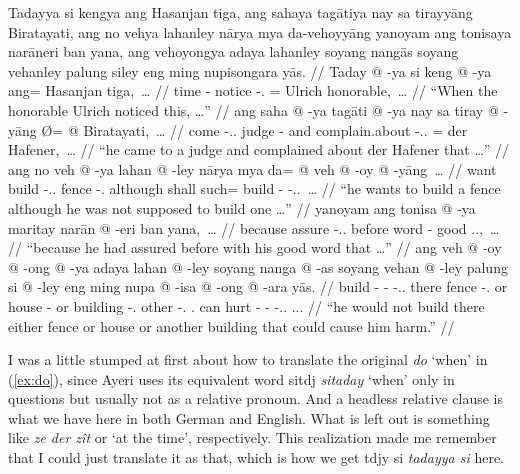 \documentclass[12pt,paper=a4]{scrartcl}
\newcommand{\fw}[1]{\textit{#1}} %
\newcommand{\ayr}[1]{{\Tagati #1}}
\newcommand{\xayr}[3]{{\Tagati #1} \emph{#2} \enquote*{#3}}
\begin{document}
\pex
	\glpreamble Tadayya si kengya ang Hasanjan tiga, ang sahaya tagātiya nay 
		sa tirayyāng Birata\-yati, ang no vehya lahanley nārya mya 
		da-vehoyyāng yanoyam ang tonisaya narāneri ban yana, ang 
		vehoyongya adaya lahanley soyang nangās soyang vehanley palung 
		siley eng ming nupisongara yās. //
	\a \label{ex:do} \begingl
		\gla Taday @ -ya si keng @ -ya ang= Hasanjan tiga,~… //
		\glb time -\Loc{} \Rel{} notice -\Tsg{}.\M{} \Aarg{}= Ulrich 
			honorable,~… //
		\glft \enquote{When the honorable Ulrich noticed this, …} //
	\endgl
	\a \begingl
		\gla ang saha @ -ya tagāti @ -ya nay sa tiray @ -yāng Ø= @ 
			{Biratayati},~… //
		\glb \AgtT{} come -\Tsg{}.\M{}.\Top{} judge -\Loc{} and \PatT{} 
			complain.about -\Tsg{}.\M{}.\Aarg{} \Top{}= {der 
			Hafener,}~… //
		\glft \enquote{he came to a judge and complained about der 
			Hafener that …} //
	\endgl
	\a \begingl
		\gla ang no veh @ -ya lahan @ -ley nārya mya da= @ veh @ -oy @ 
			-yāng~… //
		\glb \AgtT{} want build -\Tsg{}.\M{}.\Top{} fence 
			-\Parg{}.\Inan{} although shall such= build 
			-\Neg{} -\Tsg{}.\M{}.\Aarg{}~… //
		\glft \enquote{he wants to build a fence although he was not 
			supposed to build one …} //
	\endgl
	\a \begingl
		\gla yanoyam ang tonisa @ -ya maritay narān @ -eri ban yana,~… //
		\glb because \AgtT{} assure -\Tsg{}.\M{}.\Top{} before word 
			-\Ins{} good \Tsg{}.\M{}.\Gen{},~… //
		\glft \enquote{because he had assured before with his good word 
			that …} //
	\endgl
	\a \begingl
		\gla ang veh @ -oy @ -ong @ -ya adaya lahan @ -ley soyang nanga 
			@ -as soyang vehan @ -ley palung si @ -ley eng ming nupa 
			@ -isa @ -ong @ -ara yās. //
		\glb \AgtT{} build -\Neg{} -\Irr{} -\Tsg{}.\M{}.\Top{} there 
			fence -\Parg{}.\Inan{} or house -\Parg{} or building 
			-\Parg{}.\Inan{} other \Rel{} -\Parg{}.\Inan{} 
			\AgtT{}.\Inan{} can hurt -\Caus{} -\Irr{} 
			-\Tsg{}.\Inan{}.\Top{} \Tsg{}.\M{}.\Parg{}. //
		\glft \enquote{he would not build there either fence or house or 
			another building that could cause him harm.} //
	\endgl
\xe

I was a little stumped at first about how to translate the original \fw{do} 
`when' in (\ref{ex:do}), since Ayeri uses its equivalent word 
\xayr{sitdj}{sitaday}{when} only in questions but usually not as a relative 
pronoun. And a headless relative clause is what we have here in both German and 
English. What is left out is something like \fw{ze der zît} or `at the time', 
respectively. This realization made me remember that I could just translate it 
as that, which is how we get \ayr{tdjy si} \fw{tadayya si} here.
\end{document}
